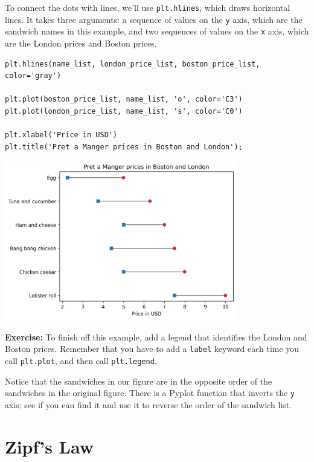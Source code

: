 To connect the dots with lines, we'll use
\passthrough{\lstinline!plt.hlines!}, which draws horizontal lines. It
takes three arguments: a sequence of values on the
\passthrough{\lstinline!y!} axis, which are the sandwich names in this
example, and two sequences of values on the \passthrough{\lstinline!x!}
axis, which are the London prices and Boston prices.

\begin{lstlisting}[]
plt.hlines(name_list, london_price_list, boston_price_list, color='gray')

plt.plot(boston_price_list, name_list, 'o', color='C3')
plt.plot(london_price_list, name_list, 's', color='C0')

plt.xlabel('Price in USD')
plt.title('Pret a Manger prices in Boston and London');
\end{lstlisting}

\begin{center}
\includegraphics[width=4in]{chapters/06_plotting_files/06_plotting_46_0.png}
\end{center}

\textbf{Exercise:} To finish off this example, add a legend that
identifies the London and Boston prices. Remember that you have to add a
\passthrough{\lstinline!label!} keyword each time you call
\passthrough{\lstinline!plt.plot!}, and then call
\passthrough{\lstinline!plt.legend!}.

Notice that the sandwiches in our figure are in the opposite order of
the sandwiches in the original figure. There is a Pyplot function that
inverts the \passthrough{\lstinline!y!} axis; see if you can find it and
use it to reverse the order of the sandwich list.

\hypertarget{zipfs-law}{%
\section{Zipf's Law}\label{zipfs-law}}

